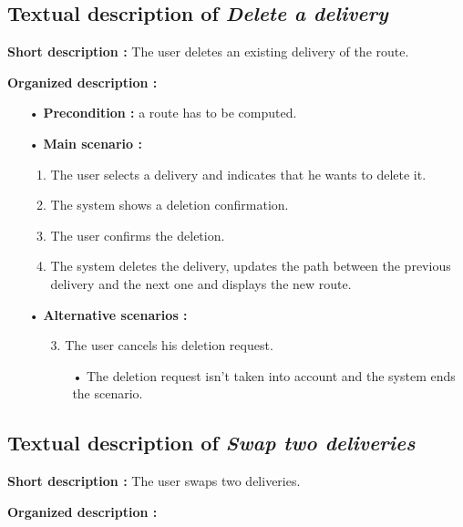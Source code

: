 \documentclass[paper=a4,fontsize=11pt]{report}
\numberwithin{equation}{section}		%
\numberwithin{figure}{section}		%
\numberwithin{table}{section}		%
\renewcommand{\it}[1]{\textit{#1}}
\begin{document}
\subsection{Textual description of \it{Delete a delivery}}
\label{subsec:textual-description-of-delete-a-delivery}

\textbf{Short description :} The user deletes an existing delivery of the route.

\textbf{Organized description :}

\begin{itemize}
  \item[•] \textbf{Precondition :} a route has to be computed.
  \item[•] \textbf{Main scenario :}
  \begin{enumerate}
    \item The user selects a delivery and indicates that he wants to delete it.
    \item The system shows a deletion confirmation.
    \item The user confirms the deletion.
    \item The system deletes the delivery, updates the path between the previous delivery and the next one and displays the new route.
  \end{enumerate}
  \item[•] \textbf{Alternative scenarios :}
  \begin{itemize}
    \item[3.] The user cancels his deletion request.
    \begin{itemize}
      \item[•] The deletion request isn’t taken into account and the system ends the scenario.
    \end{itemize}
  \end{itemize}
\end{itemize}

\subsection{Textual description of \it{Swap two deliveries}}
\label{subsec:textual-description-of-swap-two-deliveries}

\textbf{Short description :} The user swaps two deliveries.

\textbf{Organized description :}
\end{document}
